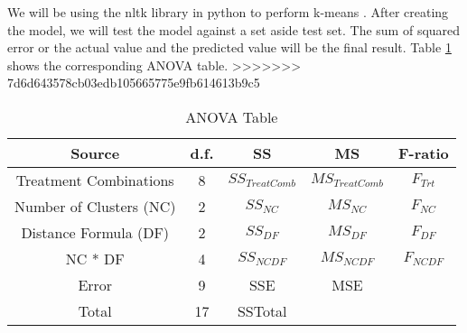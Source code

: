 \documentclass[times]{article}
\begin{document}
	We will be using the nltk library in python to perform k-means \cite{ref:nltk}. 
   After creating the model, we will test the model against a set aside test set. 
   The sum of squared error or the actual value and the predicted value will be the final result. 
   Table \ref{tab:anova} shows the corresponding ANOVA table.
>>>>>>> 7d6d643578cb03edb105665775e9fb614613b9c5

	\begin{table}[!h]
		\centering
		\caption{ANOVA Table}
		\label{tab:anova}
		\begin{tabular}{| c | c | c | c | c |}
			\hline
			Source 					& d.f.	& SS	& MS 	& F-ratio \\
			\hline
			Treatment Combinations	& 8		& $SS_{Treat Comb}$	& $MS_{Treat Comb}$	& $F_{Trt}$		\\
			\hline
			Number of Clusters (NC)	& 2		& $SS_{NC}$			& $MS_{NC}$			& $F_{NC}$ 		\\
			\hline
			Distance Formula (DF)	& 2		& $SS_{DF}$			& $MS_{DF}$			& $F_{DF}$ 		\\
			\hline
			NC * DF					& 4 	& $SS_{NC DF}$		& $MS_{NC DF}$		& $F_{NC DF}$ 	\\
			\hline
			Error					& 9 	& SSE				& MSE				& 				\\
			\hline
			Total					& 17 	& SSTotal			& 					& 				\\
			\hline
		\end{tabular}
	\end{table}

	\medskip
	
	
\end{document}
